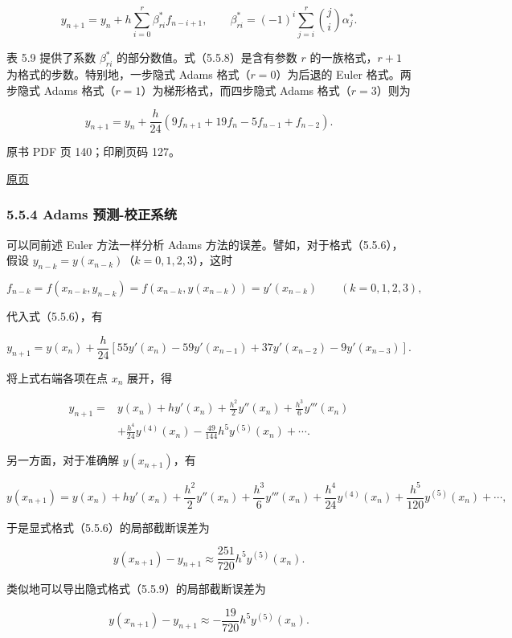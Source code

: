 \[
y_{n+1}=y_n+h\sum_{i=0}^r\beta_{ri}^*f_{n-i+1},\qquad
\beta_{ri}^*=(-1)^i\sum_{j=i}^r\binom ji\alpha_j^*.
\tag{5.5.8}
\]

表 5.9 提供了系数 \(\beta_{ri}^*\) 的部分数值。式（5.5.8）是含有参数 \(r\) 的一族格式，\(r+1\) 为格式的步数。特别地，一步隐式 Adams 格式（\(r=0\)）为后退的 Euler 格式。两步隐式 Adams 格式（\(r=1\)）为梯形格式，而四步隐式 Adams 格式（\(r=3\)）则为

\[
y_{n+1}=y_n+\frac h{24}(9f_{n+1}+19f_n-5f_{n-1}+f_{n-2}).
\tag{5.5.9}
\]

\clearpage

原书 PDF 页 140；印刷页码 127。

\href{source-images/pdf-140.jpeg}{原页}

\subsubsection{5.5.4 Adams 预测-校正系统}\label{ch05b-adams-ux9884ux6d4b-ux6821ux6b63ux7cfbux7edf}

可以同前述 Euler 方法一样分析 Adams 方法的误差。譬如，对于格式（5.5.6），假设 \(y_{n-k}=y(x_{n-k})\)（\(k=0,1,2,3\)），这时

\[
f_{n-k}=f(x_{n-k},y_{n-k})=f(x_{n-k},y(x_{n-k}))=y'(x_{n-k})\qquad(k=0,1,2,3),
\]

代入式（5.5.6），有

\[
y_{n+1}=y(x_n)+\frac h{24}[55y'(x_n)-59y'(x_{n-1})+37y'(x_{n-2})-9y'(x_{n-3})].
\]

将上式右端各项在点 \(x_n\) 展开，得

\[
\begin{aligned}
y_{n+1}={}&y(x_n)+hy'(x_n)+\frac{h^2}{2}y''(x_n)+\frac{h^3}{6}y'''(x_n)\\
&+\frac{h^4}{24}y^{(4)}(x_n)-\frac{49}{144}h^5y^{(5)}(x_n)+\cdots.
\end{aligned}
\]

另一方面，对于准确解 \(y(x_{n+1})\)，有

\[
y(x_{n+1})=y(x_n)+hy'(x_n)+\frac{h^2}{2}y''(x_n)+\frac{h^3}{6}y'''(x_n)+\frac{h^4}{24}y^{(4)}(x_n)+\frac{h^5}{120}y^{(5)}(x_n)+\cdots,
\]

于是显式格式（5.5.6）的局部截断误差为

\[
y(x_{n+1})-y_{n+1}\approx\frac{251}{720}h^5y^{(5)}(x_n).
\tag{5.5.10}
\]

类似地可以导出隐式格式（5.5.9）的局部截断误差为

\[
y(x_{n+1})-y_{n+1}\approx-\frac{19}{720}h^5y^{(5)}(x_n).
\tag{5.5.11}
\]

